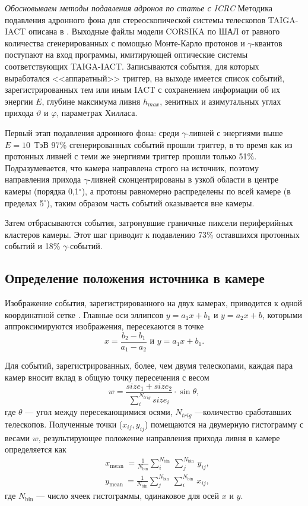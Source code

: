 \documentclass[magd,floatypics,numeref]{msudipl} %
\begin{document}
\textit{Обосновываем методы подавления адронов по статье с ICRC}
Методика подавления адронного фона для стереоскопической системы телескопов TAIGA-IACT описана в \cite{Grinyuk:20210M}. Выходные файлы модели CORSIKA по ШАЛ от равного количества сгенерированных с помощью Монте-Карло протонов и $\gamma$-квантов поступают на вход программы, имитирующей оптические системы соответствующих TAIGA-IACT. Записываются события, для которых выработался <<аппаратный>>  триггер, на выходе имеется список событий, зарегистрированных тем или иным IACT с сохранением информации об их энергии $E$, глубине максимума ливня $h_{max}$, зенитных и азимутальных углах прихода $\vartheta$ и $\varphi$, параметрах Хилласа. 

Первый этап подавления  адронного фона: среди $\gamma$-ливней с энергиями выше $E=10$~ТэВ 97\% сгенерированных событий прошли триггер, в то время как из протонных ливней с теми же энергиями триггер прошли только 51\%. Подразумевается, что камера направлена строго на источник, поэтому направления прихода $\gamma$-ливней сконцентрированы в узкой области в центре камеры (порядка 0{,}1$^{\circ}$), а протоны равномерно распределены по всей камере (в пределах 5$^{\circ}$), таким образом часть событий оказывается вне камеры.

Затем отбрасываются события, затронувшие граничные пиксели периферийных кластеров камеры. Этот шаг приводит к подавлению 73\% оставшихся протонных событий и 18\% $\gamma$-событий. 

\subsection{Определение положения источника в камере}
Изображение события, зарегистрированного на двух камерах, приводится к одной координатной сетке \cite{HOFMANN1999135}. Главные оси эллипсов $y = a_1 x + b_1$ и $y = a_2 x + b$, которыми аппроксимируются изображения, пересекаются в точке
\begin{equation}
x=\frac{b_{2}-b_{1}}{a_{1}-a_{2}} \text { и } y=a_{1} x+b_{1}.
\end{equation}

Для событий, зарегистрированных, более, чем двумя телескопами, каждая пара камер вносит вклад в общую точку пересечения с весом
\begin{equation}
w = \frac{size_{1}+size_{2}}{\sum_{i}^{N_{t r i g}} size_{i}} \cdot \sin \theta,
\end{equation}
где $\theta$ --- угол между пересекающимися осями, $N_{trig}$ ---количество сработавших телескопов. Полученные точки ($x_{ij}, y_{ij}$) помещаются на двумерную гистограмму с весами $w$, результирующее положение направления прихода ливня в камере определяется как 
\begin{align}
&x_{\text {mean }}=\frac{1}{N_{\text {bin}}} \sum_{i}^{N_{\text {bin }}} \sum_{j}^{N_{\text {bin }}} y_{i j}, \\
&y_{\text {mean }}=\frac{1}{N_{\text {bin}}} \sum_{j}^{N_{\text {bin }}} \sum_{i}^{N_{\text {bin }}} x_{i j},
\end{align}
где $N_{\text{bin}}$ --- число ячеек гистограммы, одинаковое для осей $x$ и $y$.
\end{document}
